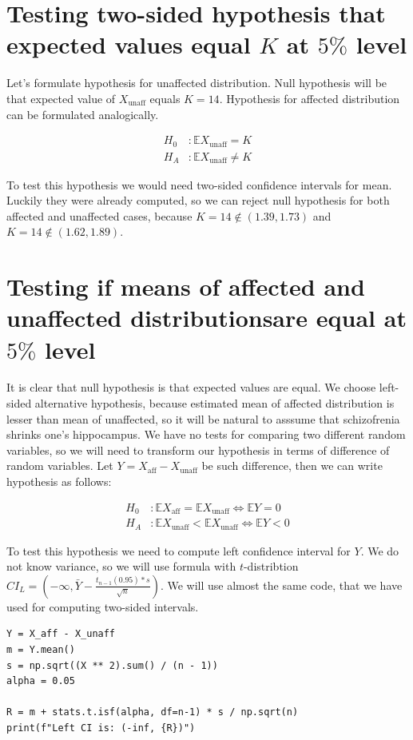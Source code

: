 \documentclass[12pt,a4paper]{article} %
\newcommand{\randv}[2][X]{#1_{\text{#2}}}
\newcommand{\E}{\mathbb{E}}
\begin{document}
\section{Testing two-sided hypothesis that expected values equal $K$ at $5\%$ level}

Let's formulate hypothesis for unaffected distribution. Null hypothesis will be that expected value of $\randv{unaff}$ equals $K = 14$. Hypothesis for affected distribution can be formulated analogically.

\begin{align*}
  H_0 &: \E\randv{unaff} = K \\
  H_A &: \E\randv{unaff} \neq K
\end{align*}

To test this hypothesis we would need two-sided confidence intervals for mean. Luckily they were already computed, so we can reject null hypothesis for both affected and unaffected cases, because $K = 14 \not\in (1.39, 1.73)$ and $K = 14 \not\in (1.62, 1.89)$.

\section{Testing if means of affected and unaffected distributionsare  equal at $5\%$ level}

It is clear that null hypothesis is that expected values are equal. We choose left-sided alternative hypothesis, because estimated mean of affected distribution is lesser than mean of unaffected, so it will be natural to asssume that schizofrenia shrinks one's hippocampus. We have no tests for comparing two different random variables, so we will need to transform our hypothesis in terms of difference of random variables. Let $Y = \randv{aff} - \randv{unaff}$ be such difference, then we can write hypothesis as follows:

\begin{align*}
  H_0 &: \E\randv{aff} = \E\randv{unaff} \iff \E Y = 0\\
  H_A &: \E\randv{unaff} < \E\randv{unaff} \iff \E Y < 0
\end{align*}

To test this hypothesis we need to compute left confidence interval for $Y$. We do not know variance, so we will use formula with $t$-distribtion $CI_L = (-\infty, \bar Y - \frac{t_{n-1}(0.95) * s}{\sqrt{n}})$. We will use almost the same code, that we have used for computing two-sided intervals.

\begin{lstlisting}
Y = X_aff - X_unaff
m = Y.mean()
s = np.sqrt((X ** 2).sum() / (n - 1))
alpha = 0.05

R = m + stats.t.isf(alpha, df=n-1) * s / np.sqrt(n)
print(f"Left CI is: (-inf, {R})")
\end{lstlisting}
\end{document}
